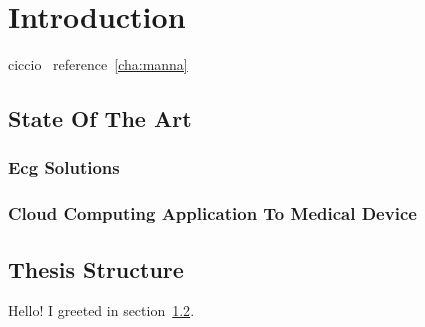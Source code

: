 \chapter{Introduction}
ciccio~\label{cha:manna}
reference~\ref{cha:manna}

\section{State Of The Art}

\subsection{Ecg Solutions}
\subsection{Cloud Computing Application To Medical Device}

\section{Thesis Structure}
\label{sec:greetings}

Hello!
I greeted in section~\ref{sec:greetings}.